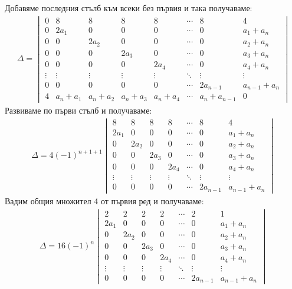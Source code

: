 \documentclass[a4paper, 12pt, oneside]{article}
\begin{document}
Добавяме последния стълб към всеки без първия и така получаваме:
\begin{align*}
\Delta = \begin{vmatrix}
    0 & 8 & 8 & 8 & 8 & \cdots & 8  & 4 \\
    0 & 2a_1 & 0 & 0 & 0 & \cdots & 0 & a_1 + a_n \\
    0 & 0 & 2a_2 & 0 & 0 & \cdots & 0 & a_2 + a_n \\
    0 & 0 & 0 & 2a_3 & 0 & \cdots & 0 & a_3 + a_n \\
    0 & 0 & 0 & 0 & 2a_4 & \cdots & 0 & a_4 + a_n \\
    \vdots & \vdots & \vdots & \vdots & \vdots & \ddots & \vdots & \vdots \\
    0 & 0 & 0 & 0 & 0 & \cdots & 2a_{n - 1} & a_{n - 1} + a_n \\
    4 & a_n + a_1 & a_n + a_2 & a_n + a_3 & a_n + a_4 & \cdots & a_n + a_{n - 1} & 0
\end{vmatrix}
\end{align*}
Развиваме по първи стълб и получаваме:
\begin{align*}
\Delta = 4(-1)^{n + 1 + 1}\begin{vmatrix}
    8 & 8 & 8 & 8 & \cdots & 8  & 4 \\
    2a_1 & 0 & 0 & 0 & \cdots & 0 & a_1 + a_n \\
    0 & 2a_2 & 0 & 0 & \cdots & 0 & a_2 + a_n \\
    0 & 0 & 2a_3 & 0 & \cdots & 0 & a_3 + a_n \\
    0 & 0 & 0 & 2a_4 & \cdots & 0 & a_4 + a_n \\
    \vdots & \vdots & \vdots & \vdots & \ddots & \vdots & \vdots \\
    0 & 0 & 0 & 0 & \cdots & 2a_{n - 1} & a_{n - 1} + a_n
\end{vmatrix}
\end{align*}
Вадим общия множител 4 от първия ред и получаваме:
\begin{align*}
\Delta = 16(-1)^n\begin{vmatrix}
    2 & 2 & 2 & 2 & \cdots & 2  & 1 \\
    2a_1 & 0 & 0 & 0 & \cdots & 0 & a_1 + a_n \\
    0 & 2a_2 & 0 & 0 & \cdots & 0 & a_2 + a_n \\
    0 & 0 & 2a_3 & 0 & \cdots & 0 & a_3 + a_n \\
    0 & 0 & 0 & 2a_4 & \cdots & 0 & a_4 + a_n \\
    \vdots & \vdots & \vdots & \vdots & \ddots & \vdots & \vdots \\
    0 & 0 & 0 & 0 & \cdots & 2a_{n - 1} & a_{n - 1} + a_n
\end{vmatrix}
\end{align*}
\end{document}
